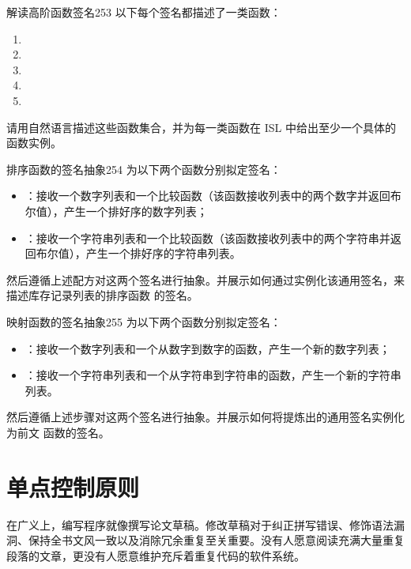 \begin{exercise}{解读高阶函数签名}{253}
以下每个签名都描述了一类函数：
\begin{enumerate}
  \item {}
  \item {}
  \item {}
  \item {}
  \item {}
\end{enumerate}
请用自然语言描述这些函数集合，并为每一类函数在 ISL 中给出至少一个具体的函数实例。
\end{exercise}

\begin{exercise}{排序函数的签名抽象}{254}
为以下两个函数分别拟定签名：
\begin{itemize}
  \item {}：接收一个数字列表和一个比较函数（该函数接收列表中的两个数字并返回布尔值），产生一个排好序的数字列表；
  \item {}：接收一个字符串列表和一个比较函数（该函数接收列表中的两个字符串并返回布尔值），产生一个排好序的字符串列表。
\end{itemize}
然后遵循上述配方对这两个签名进行抽象。并展示如何通过实例化该通用签名，来描述库存记录列表的排序函数  的签名。
\end{exercise}

\begin{exercise}{映射函数的签名抽象}{255}
为以下两个函数分别拟定签名：
\begin{itemize}
  \item {}：接收一个数字列表和一个从数字到数字的函数，产生一个新的数字列表；
  \item {}：接收一个字符串列表和一个从字符串到字符串的函数，产生一个新的字符串列表。
\end{itemize}
然后遵循上述步骤对这两个签名进行抽象。并展示如何将提炼出的通用签名实例化为前文  函数的签名。
\end{exercise}

\section{单点控制原则}
\label{sec:15_3}

在广义上，编写程序就像撰写论文草稿。修改草稿对于纠正拼写错误、修饰语法漏洞、保持全书文风一致以及消除冗余重复至关重要。没有人愿意阅读充满大量重复段落的文章，更没有人愿意维护充斥着重复代码的软件系统。


